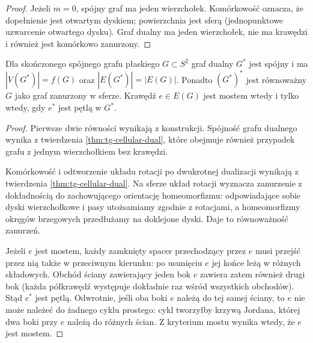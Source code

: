 \begin{proof}
Jeżeli $m=0$, spójny graf ma jeden wierzchołek.
Komórkowość oznacza, że dopełnienie jest otwartym
dyskiem; powierzchnia jest sferą (jednopunktowe
uzwarcenie otwartego dysku). Graf dualny ma jeden wierzchołek,
nie ma krawędzi i również jest komórkowo zanurzony.
\end{proof}

\begin{stwierdzenie}
\label{thm:tg-dual-basic}
Dla skończonego spójnego grafu płaskiego $G\subset S^2$
graf dualny $G^*$ jest spójny i ma
$|V(G^*)|=f(G)$ oraz $|E(G^*)|=|E(G)|$.
Ponadto $(G^*)^*$ jest równoważny $G$ jako graf zanurzony
w sferze. Krawędź $e\in E(G)$ jest mostem wtedy i tylko
wtedy, gdy $e^*$ jest pętlą w $G^*$.
\end{stwierdzenie}

\begin{proof}
Pierwsze dwie równości wynikają z konstrukcji.
Spójność grafu dualnego wynika z twierdzenia
\ref{thm:tg-cellular-dual}, które obejmuje również
przypadek grafu z jednym wierzchołkiem bez krawędzi.

Komórkowość i odtworzenie układu rotacji po
dwukrotnej dualizacji wynikają z twierdzenia
\ref{thm:tg-cellular-dual}. Na sferze układ rotacji
wyznacza zanurzenie z dokładnością do zachowującego
orientację homeomorfizmu: odpowiadające sobie dyski
wierzchołkowe i pasy utożsamiamy zgodnie z rotacjami,
a homeomorfizmy okręgów brzegowych przedłużamy
na doklejone dyski. Daje to równoważność zanurzeń.

Jeżeli $e$ jest mostem, każdy zamknięty spacer przechodzący przez $e$ musi przejść przez nią także w przeciwnym kierunku: po usunięciu $e$ jej końce leżą w różnych składowych. Obchód ściany zawierający jeden bok $e$ zawiera zatem również drugi bok (każda półkrawędź występuje dokładnie raz wśród wszystkich obchodów). Stąd $e^*$ jest pętlą.
Odwrotnie, jeśli oba boki $e$ należą do tej samej ściany,
to $e$ nie może należeć do żadnego cyklu prostego:
cykl tworzyłby krzywą Jordana, której dwa boki
przy $e$ należą do różnych ścian. Z kryterium mostu
wynika wtedy, że $e$ jest mostem.
\end{proof}

